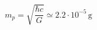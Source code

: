 \begin{equation} \label{eqp1}
m_{p}= \sqrt{ \frac{\hbar c}{G} } \simeq 2.2 \cdot 10^{-5} \, \mbox{g} 
\end{equation}

